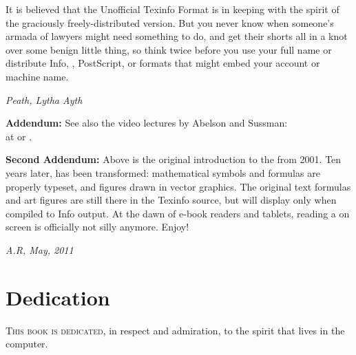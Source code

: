 It is believed that the Unofficial Texinfo Format is in keeping with the
spirit of the graciously freely-distributed  version.  But you
never know when someone's armada of lawyers might need something to do, and get
their shorts all in a knot over some benign little thing, so think twice before
you use your full name or distribute Info, , PostScript, or
 formats that might embed your account or machine name.

\vspace{0.5em}
\noindent
\textit{Peath, Lytha Ayth}

\vspace{1.0em}
\noindent
\textbf{Addendum:} See also the  video lectures by Abelson and Sussman:\\
at \href{http://groups.csail.mit.edu/mac/classes/6.001/abelson-sussman-lectures/}{} or
\href{http://ocw.mit.edu/courses/electrical-engineering-and-computer-science/6-001-structure-and-interpretation-of-computer-programs-spring-2005/video-lectures/}{}.

\vspace{0.5em}
\noindent
\textbf{Second Addendum:} Above is the original introduction to the 
from 2001. Ten years later,  has been transformed: mathematical
symbols and formulas are properly typeset, and figures drawn in
vector graphics. The original text formulas and  art figures
are still there in the Texinfo source, but will display only when compiled
to Info output. At the dawn of e-book readers and tablets, reading a
 on screen is officially not silly anymore. Enjoy!

\enlargethispage{\baselineskip}

\vspace{0.5em}
\noindent
\textit{A.R, May, 2011}

\chapter*{Dedication}
\label{Dedication}

\lettrine{T}{his book is dedicated}, in respect and admiration, to the spirit that lives in
the computer.

